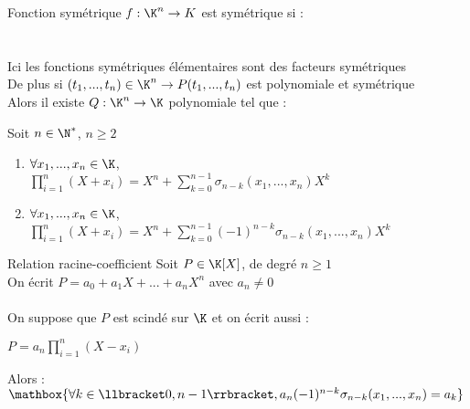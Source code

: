 \documentclass[12pt,a4paper]{report}
\begin{document}
\begin{definition}{Fonction symétrique}{}
$f : \K^n \to K$ est symétrique si : \\
\\
\\
Ici les fonctions symétriques élémentaires sont des facteurs symétriques \\
De plus si $(t_1 , ..., t_n) \in \K^n \to P(t_1 , ..., t_n)$ est polynomiale et symétrique \\
Alors il existe $Q : \K^n \to \K$ polynomiale tel que : \\
\end{definition}

\begin{theoreme}{}{}
Soit $n\in \N^*$, $n\geq 2$
\begin{enumerate}
    \item $\forall x_1 , ..., x_n \in \K$, \\
    $\displaystyle \prod^n_{i=1} (X+x_i) = X^n + \sum^{n-1}_{k=0} \sigma_{n-k} (x_1, ..., x_n)X^k$ 
    \item $\forall x_1 , ..., x_n \in \K$, \\
    $\displaystyle \prod^n_{i=1} (X+x_i) = X^n + \sum^{n-1}_{k=0} (-1)^{n-k}\sigma_{n-k} (x_1, ..., x_n)X^k$ 
\end{enumerate}
\end{theoreme}

\begin{corollaire}{Relation racine-coefficient}{}
Soit $P \in \K[X]$, de degré $n\geq 1$\\
On écrit $P=a_0 + a_1 X + ...+ a_n  X^n$ avec $a_n \neq 0$\\
\\
On suppose que $P$ est scindé sur $\K$ et on écrit aussi :
\begin{center}
    $P= a_n \prod^n_{i=1} (X-x_i)$ 
\end{center} 
Alors : $\mathbox{\forall k \in \llbracket 0, n-1 \rrbracket, a_n (-1)^{n-k} \sigma_{n-k}(x_1 ,..., x_n) = a_k}$ \ie {}
\end{corollaire}

\begin{demo}

\end{demo}
\end{document}
